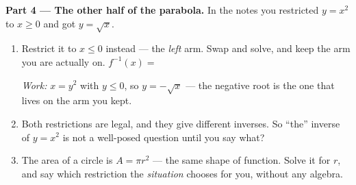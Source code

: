 \documentclass[10pt]{article}
\begin{document}
\begin{tcolorbox}[colback=white, colframe=black!40, title=\textbf{Tier E --- Extension},
    fonttitle=\bfseries, arc=1.5mm, left=3mm, right=3mm, top=2mm, bottom=2mm, breakable]
\vspace{4pt}
\textbf{Part 4 --- The other half of the parabola.} In the notes you restricted $y=x^{2}$ to
$x\ge0$ and got $y=\sqrt{x}$.
\begin{enumerate}[label=(\alph*), leftmargin=1.9em, itemsep=5pt, start=13]
  \item Restrict it to $x\le0$ instead --- the \emph{left} arm. Swap and solve, and keep the arm you
        are actually on. \; $f^{-1}(x)=$ 

        {\small \emph{Work:} $x=y^{2}$ with $y\le0$, so $y=-\sqrt{x}$ --- the negative root is the
        one that lives on the arm you kept.}
  \item Both restrictions are legal, and they give different inverses. So ``the'' inverse of
        $y=x^{2}$ is not a well-posed question until you say what? 
  \item The area of a circle is $A=\pi r^{2}$ --- the same shape of function. Solve it for $r$, and
        say which restriction the \emph{situation} chooses for you, without any algebra.
\end{enumerate}
\end{tcolorbox}
\end{document}
